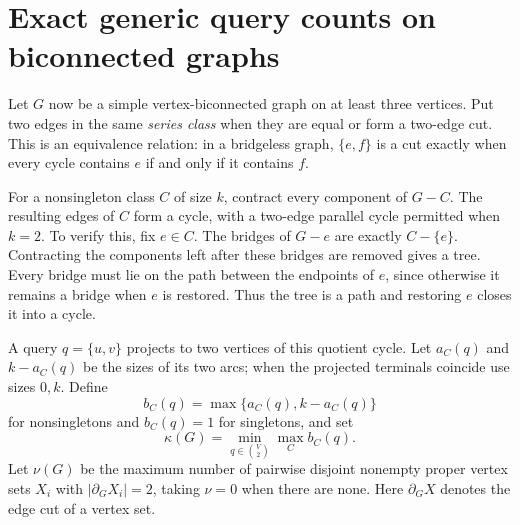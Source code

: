 \documentclass[11pt,letterpaper]{article}
\begin{document}
\section{Exact generic query counts on biconnected graphs}\label{sec:counts}
Let $G$ now be a simple vertex-biconnected graph on at least three vertices. Put two edges in the same \emph{series class} when they are equal or form a two-edge cut. This is an equivalence relation: in a bridgeless graph, $\{e,f\}$ is a cut exactly when every cycle contains $e$ if and only if it contains $f$.

For a nonsingleton class $C$ of size $k$, contract every component of $G-C$. The resulting edges of $C$ form a cycle, with a two-edge parallel cycle permitted when $k=2$. To verify this, fix $e\in C$. The bridges of $G-e$ are exactly $C-\{e\}$. Contracting the components left after these bridges are removed gives a tree. Every bridge must lie on the path between the endpoints of $e$, since otherwise it remains a bridge when $e$ is restored. Thus the tree is a path and restoring $e$ closes it into a cycle.

A query $q=\{u,v\}$ projects to two vertices of this quotient cycle. Let $a_C(q)$ and $k-a_C(q)$ be the sizes of its two arcs; when the projected terminals coincide use sizes $0,k$. Define
\[
 b_C(q)=\max\{a_C(q),k-a_C(q)\}
\]
for nonsingletons and $b_C(q)=1$ for singletons, and set
\[
 \kappa(G)=\min_{q\in\binom V2}\max_C b_C(q).
\]
Let $\nu(G)$ be the maximum number of pairwise disjoint nonempty proper vertex sets $X_i$ with $|\partial_G X_i|=2$, taking $\nu=0$ when there are none. Here $\partial_G X$ denotes the edge cut of a vertex set.
\end{document}
